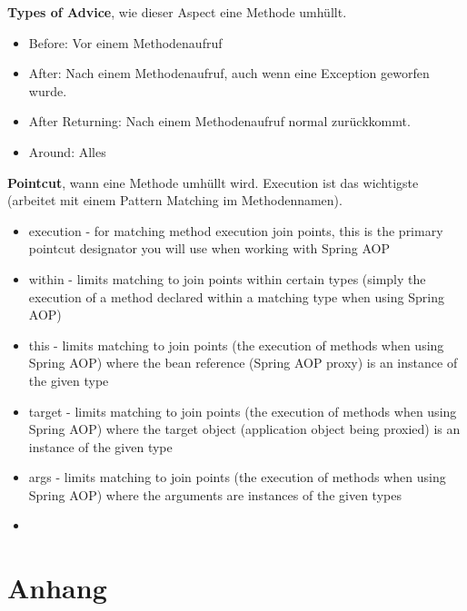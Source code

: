 \documentclass[10pt]{scrartcl}
\newcommand{\Bold}[1]{\textbf{#1}} %
\begin{document}
\Bold{Types of Advice}, wie dieser Aspect eine Methode umhüllt.
\begin{itemize}
	\item Before: Vor einem Methodenaufruf
	\item After: Nach einem Methodenaufruf, auch wenn eine Exception geworfen wurde.
	\item After Returning: Nach einem Methodenaufruf normal zurückkommt.
	\item Around: Alles
\end{itemize}

\Bold{Pointcut}, wann eine Methode umhüllt wird. Execution ist das wichtigste (arbeitet mit einem Pattern Matching im Methodennamen).
\begin{itemize}
	\item execution - for matching method execution join points, this is the primary pointcut designator you will use when working with Spring AOP
	\item within - limits matching to join points within certain types (simply the execution of a method declared within a matching type when using Spring AOP)
	\item this - limits matching to join points (the execution of methods when using Spring AOP) where the bean reference (Spring AOP proxy) is an instance of the given type
	\item target - limits matching to join points (the execution of methods when using Spring AOP) where the target object (application object being proxied) is an instance of the given type
	\item args - limits matching to join points (the execution of methods when using Spring AOP) where the arguments are instances of the given types
	\item 
\end{itemize}


\section{Anhang}


\end{document}

